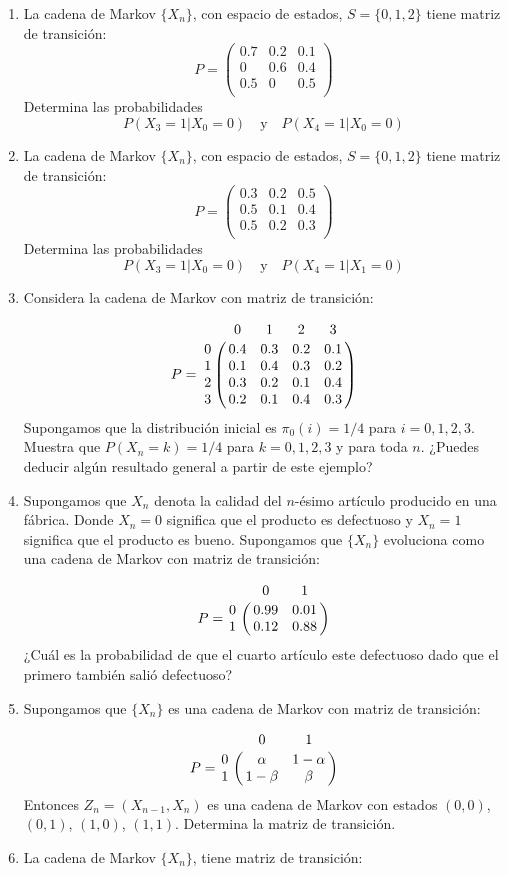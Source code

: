 \documentclass{report}
\begin{document}
\begin{enumerate}
\item La cadena de Markov $\{X_n\}$, con espacio de estados, $S =\{0,1,2\}$ tiene matriz de transición:
$$
P = \left(\begin{matrix}
	0 .7 & 0.2 & 0.1 \\
	0    & 0.6 & 0.4 \\
	0 .5 & 0  & 0.5 \\
\end{matrix}\right)
$$
Determina las probabilidades 
$$
P(X_3=1\vert X_0=0)\quad \mbox{y}\quad P(X_4=1\vert X_0=0)
$$
\item La cadena de Markov $\{X_n\}$, con espacio de estados, $S =\{0,1,2\}$ tiene matriz de transición:
$$
P = \left(\begin{matrix}
	0 .3 & 0.2 & 0.5 \\
	0.5  & 0.1 & 0.4 \\
	0 .5 & 0.2  & 0.3 \\
\end{matrix}\right)
$$
Determina las probabilidades 
$$
P(X_3=1\vert X_0=0)\quad \mbox{y}\quad P(X_4=1\vert X_1=0)
$$
\item Considera la cadena de Markov con matriz de transición:

$$
P = \bordermatrix{~ & 0   & 1   & 2 & 3 \cr
                  0 & 0.4 & 0.3 & 0.2 & 0.1 \cr
                  1 & 0.1 & 0.4 & 0.3 & 0.2\cr
                  2 & 0.3 & 0.2 & 0.1 & 0.4 \cr
                  3 & 0.2 & 0.1 & 0.4 & 0.3\cr             
                  }
$$
Supongamos que la distribución inicial es $\pi_0(i)=1/4$ para $i = 0,1,2,3$. Muestra que $P(X_n = k) = 1/4$ para $k = 0,1,2,3$ y para toda $n$. ¿Puedes deducir algún resultado general a partir de este ejemplo?
\item Supongamos que $X_n$ denota la calidad del $n$-ésimo artículo producido en una fábrica. Donde $X_n=0$ significa que el producto es defectuoso y $X_n=1$ significa que el producto es bueno. Supongamos que $\{X_n\}$ evoluciona como una cadena de Markov con matriz de transición:

$$
P = \bordermatrix{~ & 0   & 1   \cr
                  0 & 0.99 & 0.01 \cr
                  1 & 0.12 & 0.88 \cr
                  }
$$
¿Cuál es la probabilidad de que el cuarto artículo este defectuoso dado que el primero también salió defectuoso?
\item Supongamos que $\{X_n\}$ es una cadena de Markov con matriz de transición:

$$
P = \bordermatrix{~ & 0   & 1   \cr
                  0 & \alpha & 1-\alpha \cr
                  1 & 1-\beta & \beta \cr
                  }
$$
Entonces $Z_n= (X_{n-1},X_n)$ es una cadena de Markov con estados $(0,0)$, $(0,1)$, $(1,0)$, $(1,1)$. Determina la matriz de transición.
\item La cadena de Markov $\{X_n\}$, tiene matriz de transición:


\end{enumerate}
\end{document}
